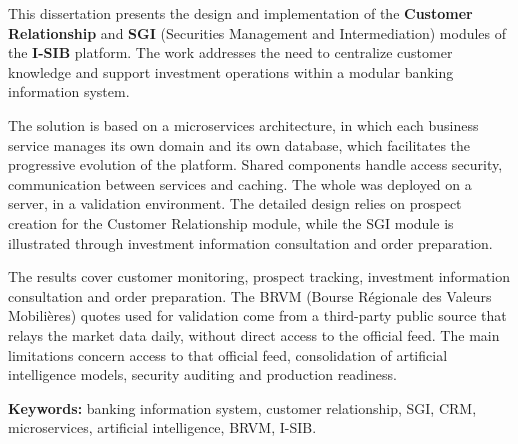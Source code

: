 \hspace{0.5cm}
This dissertation presents the design and implementation of the \textbf{Customer
Relationship} and \textbf{SGI} (Securities Management and Intermediation)
modules of the \textbf{I-SIB} platform. The work addresses the need to
centralize customer knowledge and support investment operations within a modular
banking information system.

\hspace{0.5cm}
The solution is based on a microservices architecture, in which each business
service manages its own domain and its own database, which facilitates the
progressive evolution of the platform. Shared components handle access security,
communication between services and caching. The whole was deployed on a server,
in a validation environment. The detailed design relies on prospect creation for
the Customer Relationship module, while the SGI module is illustrated through
investment information consultation and order preparation.

\hspace{0.5cm}
The results cover customer monitoring, prospect tracking, investment information
consultation and order preparation. The BRVM (Bourse Régionale des Valeurs
Mobilières) quotes used for validation come from a third-party public source
that relays the market data daily, without direct access to the official feed.
The main limitations concern access to that official feed, consolidation of
artificial intelligence models, security auditing and production readiness.

\vspace{0.8cm}
\noindent
\textbf{Keywords:} banking information system, customer relationship, SGI, CRM,
microservices, artificial intelligence, BRVM, I-SIB.

\cleardoublepage

